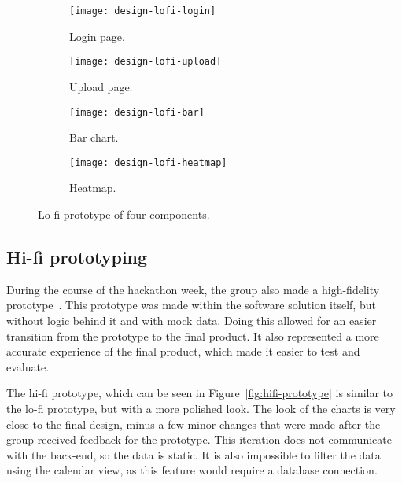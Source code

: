 \begin{figure}[H]
    \centering
    \begin{subfigure}{.49\textwidth}
        \centering
        \texttt{[image: design-lofi-login]}
        \caption{Login page.
        }\label{subfig:lofi-login}
    \end{subfigure}
    \begin{subfigure}{.49\textwidth}
        \centering
        \texttt{[image: design-lofi-upload]}
        \caption{Upload page.
        }\label{subfig:lofi-upload}
    \end{subfigure}
    \par\medskip
    \begin{subfigure}{.49\textwidth}
        \centering
        \texttt{[image: design-lofi-bar]}
        \caption{Bar chart.
        }\label{subfig:lofi-bar}
    \end{subfigure}
    \begin{subfigure}{.49\textwidth}
        \centering
        \texttt{[image: design-lofi-heatmap]}
        \caption{Heatmap.
        }\label{subfig:lofi-heatmap}
    \end{subfigure}
    \caption{Lo-fi prototype of four components.
    }\label{fig:lofi-prototype}
\end{figure}

\subsection{Hi-fi prototyping}\label{subsec:hi-fi-prototyping}

During the course of the hackathon week, the group also made a high-fidelity prototype~\cite{hi-lo-fidelity}.
This prototype was made within the software solution itself, but without logic behind it and with mock data.
Doing this allowed for an easier transition from the prototype to the final product.
It also represented a more accurate experience of the final product, which made it easier to test and evaluate.

The hi-fi prototype, which can be seen in Figure~\ref{fig:hifi-prototype} is similar to the lo-fi prototype, but with a
more polished look.
The look of the charts is very close to the final design, minus a few minor changes that were made after the group
received feedback for the prototype.
This iteration does not communicate with the back-end, so the data is static.
It is also impossible to filter the data using the calendar view, as this feature would require a database connection.

